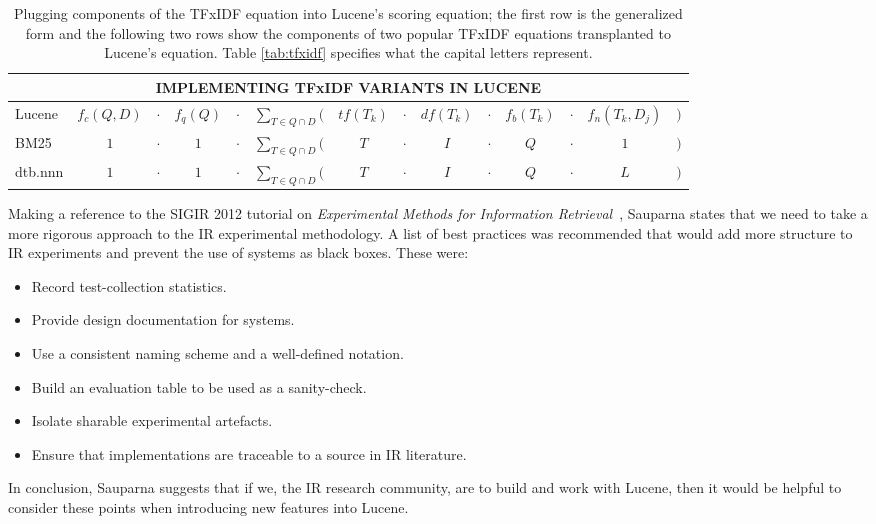 \begin{table}[bht!]
  \centering
  \small
  \begin{minipage}[t]{0.94\textwidth}

    \begin{tabular}{lccccccccccccc}
      \multicolumn{14}{c}{IMPLEMENTING TFxIDF VARIANTS IN LUCENE}
      \\
      \hline\hline

      Lucene    & $f_{c}(Q,D)$ & $\cdot$  & $f_{q}(Q)$
      & $\cdot$ & $\displaystyle\sum_{T \in Q \cap D}($  & $tf(T_{k})$
      & $\cdot$ & $df(T_{k})$  & $\cdot$  & $f_{b}(T_{k})$
      & $\cdot$ & $f_{n}(T_{k}, D_{j})$   & $)$ \\
      
      BM25      & $1$          &  $\cdot$ & $1$
      & $\cdot$ & $\displaystyle\sum_{T \in Q \cap D}($  & $T$
      & $\cdot$ & $I$          & $\cdot$  & $Q$
      & $\cdot$ & $1$          & $)$ \\

      dtb.nnn   & $1$          & $\cdot$  & $1$
      & $\cdot$ & $\displaystyle\sum_{T \in Q \cap D}($  & $T$
      & $\cdot$ & $I$          & $\cdot$  & $Q$
      & $\cdot$ & $L$          & $)$ \\

      \hline\hline
    \end{tabular}

    \caption{\small Plugging components of the TFxIDF equation into
      Lucene's scoring equation; the first row is the generalized form
      and the following two rows show the components of two popular
      TFxIDF equations transplanted to Lucene's equation. Table
      \ref{tab:tfxidf} specifies what the capital letters represent.}

    \label{tab:lucene}

  \end{minipage}
\end{table}


Making a reference to the SIGIR 2012 tutorial on \emph{Experimental
  Methods for Information
  Retrieval}~\cite{Metzler:2012:EMI:2348283.2348534}, Sauparna states
that we need to take a more rigorous approach to the IR experimental
methodology. A list of best practices was recommended that would add
more structure to IR experiments and prevent the use of systems as
black boxes. These were:

\begin{itemize}
\item Record test-collection statistics.
\item Provide design documentation for systems.
\item Use a consistent naming scheme and a well-defined notation.
\item Build an evaluation table to be used as a sanity-check.
\item Isolate sharable experimental artefacts.
\item Ensure that implementations are traceable to a source in IR
  literature.
\end{itemize}

In conclusion, Sauparna suggests that if we, the IR research
community, are to build and work with Lucene, then it would be helpful
to consider these points when introducing new features into Lucene.


